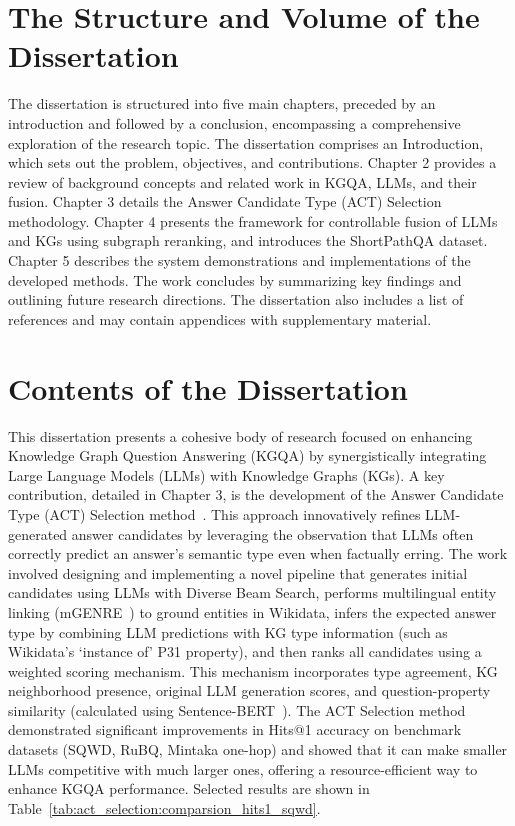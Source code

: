 \section*{The Structure and Volume of the Dissertation}
\label{sec:synopsis:structure}
The dissertation is structured into five main chapters, preceded by an introduction and followed by a conclusion, encompassing a comprehensive exploration of the research topic.
The dissertation comprises an Introduction, which sets out the problem, objectives, and contributions. Chapter 2 provides a review of background concepts and related work in KGQA, LLMs, and their fusion. Chapter 3 details the Answer Candidate Type (ACT) Selection methodology. Chapter 4 presents the framework for controllable fusion of LLMs and KGs using subgraph reranking, and introduces the ShortPathQA dataset. Chapter 5 describes the system demonstrations and implementations of the developed methods. The work concludes by summarizing key findings and outlining future research directions. The dissertation also includes a list of references and may contain appendices with supplementary material.

\section*{Contents of the Dissertation}
\label{sec:synopsis:contents}
This dissertation presents a cohesive body of research focused on enhancing Knowledge Graph Question Answering (KGQA) by synergistically integrating Large Language Models (LLMs) with Knowledge Graphs (KGs). A key contribution, detailed in Chapter 3, is the development of the Answer Candidate Type (ACT) Selection method~\cite{DBLP:journals/corr/abs-2310-07008}. This approach innovatively refines LLM-generated answer candidates by leveraging the observation that LLMs often correctly predict an answer's semantic type even when factually erring. The work involved designing and implementing a novel pipeline that generates initial candidates using LLMs with Diverse Beam Search, performs multilingual entity linking (mGENRE~\cite{decao2021multilingual}) to ground entities in Wikidata, infers the expected answer type by combining LLM predictions with KG type information (such as Wikidata's `instance of' P31 property), and then ranks all candidates using a weighted scoring mechanism. This mechanism incorporates type agreement, KG neighborhood presence, original LLM generation scores, and question-property similarity (calculated using Sentence-BERT~\cite{reimers-2019-sentence-bert}). The ACT Selection method demonstrated significant improvements in Hits@1 accuracy on benchmark datasets (SQWD, RuBQ, Mintaka one-hop) and showed that it can make smaller LLMs competitive with much larger ones, offering a resource-efficient way to enhance KGQA performance. Selected results are shown in Table~\ref{tab:act_selection:comparsion_hits1_sqwd}.


